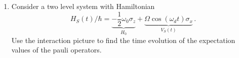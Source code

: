 
\begin{enumerate}
  \item Consider a two level system with Hamiltonian
    \begin{equation}
      H_S(t) / \hbar = \underbrace{-\frac{1}{2} \omega_0 \sigma_z}_{H_0} + \underbrace{\Omega \cos(\omega_d t) \sigma_x}_{V_S(t)}
      \, .
    \end{equation}
    Use the interaction picture to find the time evolution of the expectation values of the pauli operators.
\end{enumerate}

